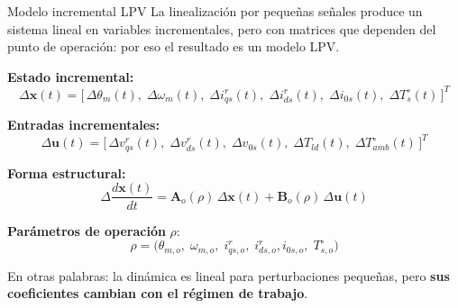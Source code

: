 \documentclass[aspectratio=169,t]{beamer}
\begin{document}
\begin{frame}{Modelo incremental LPV}
{\small\color{uncGray}La linealización por pequeñas señales produce un sistema lineal en variables incrementales, pero con matrices que dependen del punto de operación: por eso el resultado es un modelo LPV.}\par
\vspace{3mm}

\textbf{Estado incremental:}
\begin{equation*}
\Delta\bm{x}(t)=
\big[\,\Delta\theta_m(t),\;\Delta\omega_m(t),\;\Delta i_{qs}^{r}(t),\;\Delta i_{ds}^{r}(t),\;\Delta i_{0s}(t),\;\Delta T_s^\circ(t)\,\big]^T
\end{equation*}

\textbf{Entradas incrementales:}
\begin{equation*}
\Delta\bm{u}(t)=
\big[\,\Delta v_{qs}^{r}(t),\;\Delta v_{ds}^{r}(t),\;\Delta v_{0s}(t),\;\Delta T_{ld}(t),\;\Delta T_{amb}^\circ(t)\,\big]^T
\end{equation*}

\textbf{Forma estructural:}
\begin{equation*}
\Delta\frac{d\bm{x}(t)}{dt}=\bm{A}_o(\rho)\,\Delta\bm{x}(t)+\bm{B}_o(\rho)\,\Delta\bm{u}(t)
\end{equation*}

\textbf{Parámetros de operación} $\rho$:
\begin{equation*}
\rho=\big(\theta_{m,o},\;\omega_{m,o},\;i_{qs,o}^{r},\;i_{ds,o}^{r},i_{0s,o},\;T_{s,o}^\circ\big)
\end{equation*}

{\small En otras palabras: la dinámica es lineal para perturbaciones pequeñas, pero \textbf{sus coeficientes cambian con el régimen de trabajo}.}
\end{frame}
\end{document}
